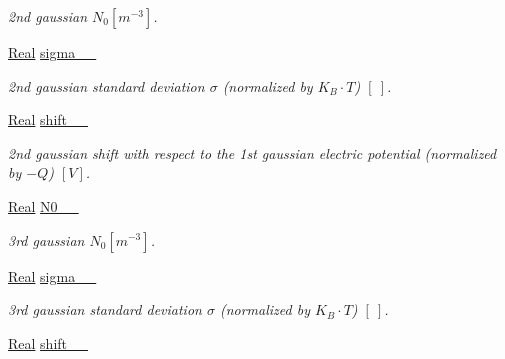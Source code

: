 \begin{DoxyCompactItemize}
\begin{DoxyCompactList}\small\item\em 2nd gaussian $ N_0 \left[ m^{-3} \right] $. \end{DoxyCompactList}\item 
\hypertarget{classParamList_a3ead6e4cc08dc0320e0b98c29e6d9337}{\hyperlink{typedefs_8h_a060b837c3b4486ee35317744156f3da2}{Real} \hyperlink{classParamList_a3ead6e4cc08dc0320e0b98c29e6d9337}{sigma\-\_\-\_\-}}\label{classParamList_a3ead6e4cc08dc0320e0b98c29e6d9337}

\begin{DoxyCompactList}\small\item\em 2nd gaussian standard deviation $ \sigma $ (normalized by $ K_B \cdot T $) $ \left[ ~ \right] $. \end{DoxyCompactList}\item 
\hypertarget{classParamList_a0f5e1e6350aeec57d0b7dacba5d86230}{\hyperlink{typedefs_8h_a060b837c3b4486ee35317744156f3da2}{Real} \hyperlink{classParamList_a0f5e1e6350aeec57d0b7dacba5d86230}{shift\-\_\-\_\-}}\label{classParamList_a0f5e1e6350aeec57d0b7dacba5d86230}

\begin{DoxyCompactList}\small\item\em 2nd gaussian shift with respect to the 1st gaussian electric potential (normalized by $ -Q $) $ \left[ V \right] $. \end{DoxyCompactList}\item 
\hypertarget{classParamList_a180b65203622e6c324a5f78bd16ac4d7}{\hyperlink{typedefs_8h_a060b837c3b4486ee35317744156f3da2}{Real} \hyperlink{classParamList_a180b65203622e6c324a5f78bd16ac4d7}{N0\-\_\-\_\-}}\label{classParamList_a180b65203622e6c324a5f78bd16ac4d7}

\begin{DoxyCompactList}\small\item\em 3rd gaussian $ N_0 \left[ m^{-3} \right] $. \end{DoxyCompactList}\item 
\hypertarget{classParamList_ad0e6dd2c004d045b411bf0f0bb0544e2}{\hyperlink{typedefs_8h_a060b837c3b4486ee35317744156f3da2}{Real} \hyperlink{classParamList_ad0e6dd2c004d045b411bf0f0bb0544e2}{sigma\-\_\-\_\-}}\label{classParamList_ad0e6dd2c004d045b411bf0f0bb0544e2}

\begin{DoxyCompactList}\small\item\em 3rd gaussian standard deviation $ \sigma $ (normalized by $ K_B \cdot T $) $ \left[ ~ \right] $. \end{DoxyCompactList}\item 
\hypertarget{classParamList_a84789797624123c5835390017f5520fe}{\hyperlink{typedefs_8h_a060b837c3b4486ee35317744156f3da2}{Real} \hyperlink{classParamList_a84789797624123c5835390017f5520fe}{shift\-\_\-\_\-}}\label{classParamList_a84789797624123c5835390017f5520fe}


\end{DoxyCompactItemize}
